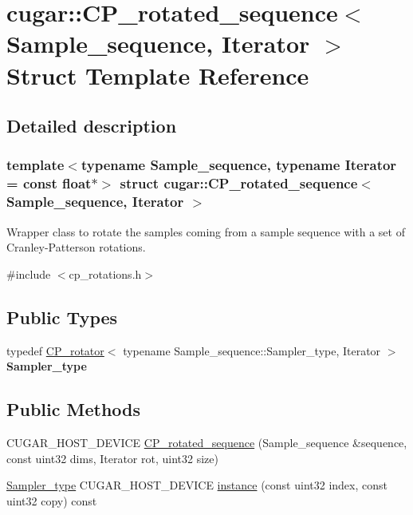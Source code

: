 \hypertarget{structcugar_1_1_c_p__rotated__sequence}{}\section{cugar\+:\+:C\+P\+\_\+rotated\+\_\+sequence$<$ Sample\+\_\+sequence, Iterator $>$ Struct Template Reference}
\label{structcugar_1_1_c_p__rotated__sequence}


\subsection{Detailed description}
\subsubsection*{template$<$typename Sample\+\_\+sequence, typename Iterator = const float$\ast$$>$\newline
struct cugar\+::\+C\+P\+\_\+rotated\+\_\+sequence$<$ Sample\+\_\+sequence, Iterator $>$}

Wrapper class to rotate the samples coming from a sample sequence with a set of Cranley-\/\+Patterson rotations. 

{\ttfamily \#include $<$cp\+\_\+rotations.\+h$>$}

\subsection*{Public Types}
\begin{DoxyCompactItemize}
\item 
\mbox{\label{structcugar_1_1_c_p__rotated__sequence_a894951bf501a32979a836eead10b4667}} 
typedef \hyperlink{structcugar_1_1_c_p__rotator}{C\+P\+\_\+rotator}$<$ typename Sample\+\_\+sequence\+::\+Sampler\+\_\+type, Iterator $>$ {\bfseries Sampler\+\_\+type}
\end{DoxyCompactItemize}
\subsection*{Public Methods}
\begin{DoxyCompactItemize}
\item 
C\+U\+G\+A\+R\+\_\+\+H\+O\+S\+T\+\_\+\+D\+E\+V\+I\+CE \hyperlink{structcugar_1_1_c_p__rotated__sequence_a89118c80f2c2e00189cc2c1f130e29c2}{C\+P\+\_\+rotated\+\_\+sequence} (Sample\+\_\+sequence \&sequence, const uint32 dims, Iterator rot, uint32 size)
\item 
\hyperlink{structcugar_1_1_c_p__rotator}{Sampler\+\_\+type} C\+U\+G\+A\+R\+\_\+\+H\+O\+S\+T\+\_\+\+D\+E\+V\+I\+CE \hyperlink{structcugar_1_1_c_p__rotated__sequence_a8d1e472dbd3a1e681a3617f7abedd103}{instance} (const uint32 index, const uint32 copy) const
\end{DoxyCompactItemize}
